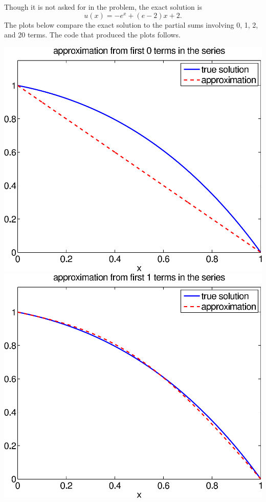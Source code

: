 {\begin{solution}
\begin{enumerate}
Though it is not asked for in the problem, the exact solution is
\[ u(x) = -e^x+(e-2)x+2.\]
The plots below compare the exact solution to the partial sums involving
$0$, 1, 2, and 20 terms.  The code that produced the plots follows.
\begin{center}
   \includegraphics[scale=0.4]{bvps1_0}\quad
   \includegraphics[scale=0.4]{bvps1_1}


\end{center}
\end{enumerate}
\end{solution}}
